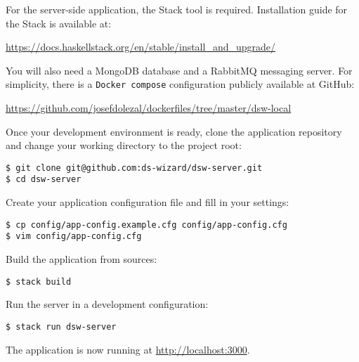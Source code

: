 For the server-side application, the Stack tool is required.
Installation guide for the Stack is available at:

\begin{center}
    \url{https://docs.haskellstack.org/en/stable/install_and_upgrade/}
\end{center}

You will also need a MongoDB database and a RabbitMQ messaging server.
For simplicity, there is a \texttt{Docker compose} configuration publicly available at GitHub:

\begin{center}\small
    \url{https://github.com/josefdolezal/dockerfiles/tree/master/dsw-local}
\end{center}

Once your development environment is ready, clone the application repository and change your working directory to the project root:

\begin{verbatim}
$ git clone git@github.com:ds-wizard/dsw-server.git
$ cd dsw-server
\end{verbatim}

Create your application configuration file and fill in your settings:

\begin{verbatim}
$ cp config/app-config.example.cfg config/app-config.cfg
$ vim config/app-config.cfg
\end{verbatim}

Build the application from sources:

\begin{verbatim}
$ stack build
\end{verbatim}

Run the server in a development configuration:

\begin{verbatim}
$ stack run dsw-server
\end{verbatim}

The application is now running at \url{http://localhost:3000}.
